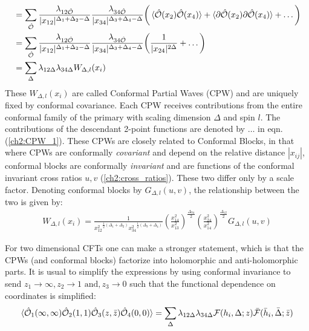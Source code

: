   \begin{align}
  &= \sum_{\hat{\mathcal{{O}}}}  \frac{\lambda_{12\hat{\mathcal{{O}}}}}{|x_{12}|^{\Delta_1+\Delta_2-\Delta}} \frac{\lambda_{34\hat{\mathcal{{O}}}}}{|x_{34}|^{\Delta_3+\Delta_4-\Delta}} \bigg( \braket{\hat{\mathcal{{O}}}(x_2)\hat{\mathcal{{O}}}(x_4)}+\braket{\partial \hat{\mathcal{{O}}}(x_2) \partial \hat{\mathcal{{O}}}(x_4)}+\dots \bigg) \label{ch2:CPW_0}\\
  &= \sum_{\hat{\mathcal{{O}}}}  \frac{\lambda_{12\hat{\mathcal{{O}}}}}{|x_{12}|^{\Delta_1+\Delta_2-\Delta}} \frac{\lambda_{34\hat{\mathcal{{O}}}}}{|x_{34}|^{\Delta_3+\Delta_4-\Delta}} \bigg( \frac{1}{|x_{24}|^{2\Delta}}+\dots \bigg) \label{ch2:CPW_1}\\
   &=\sum_{\Delta}  \lambda_{12\Delta} \lambda_{34\Delta} W_{\Delta,l}(x_i) \label{ch2:CPW_2}
  \end{align}
  These $W_{\Delta,l}(x_i)$ are called Conformal Partial Waves (CPW) and are uniquely fixed by conformal covariance. Each CPW receives contributions from the entire conformal family of the primary with scaling dimension $\Delta$ and spin $l$. The contributions of the descendant 2-point functions are denoted by $\dots$ in eqn. (\ref{ch2:CPW_1}). These CPWs are closely related to Conformal Blocks, in that where CPWs are conformally \emph{covariant} and depend on the relative distance $|x_{ij}|$, conformal blocks are conformally \emph{invariant} and are functions of the conformal invariant cross ratios $u,v$ (\ref{ch2:cross_ratios}). These two differ only by a scale factor. Denoting conformal blocks by $G_{\Delta,l}(u,v)$, the relationship between the two is given by:
  \begin{align} \label{ch2:CPW}
   W_{\Delta,l}(x_i)=\frac{1}{{x_{12}^2}^{\frac{1}{2}(\Delta_1+\Delta_2)}{x_{34}^2}^{\frac{1}{2}(\Delta_3+\Delta_4)}} \left(\frac{x_{14}^2} {x_{13}^2}\right)^\frac{\Delta_{34}}{2} \left(\frac{x_{24}^2}{x_{14}^2}\right)^\frac{\Delta_{12}}{2} G_{\Delta,l}(u,v)
  \end{align}
  
  For two dimensional CFTs one can make a stronger statement, which is that the CPWs (and conformal blocks) factorize into holomorphic and anti-holomorphic parts. It is usual to simplify the expressions by using conformal invariance to send $z_1 \to \infty, z_2 \to 1 \text{ and}, z_3 \to 0$ such that the functional dependence on coordinates is simplified:
  \begin{align}
   \braket{\hat{\mathcal{{O}}}_1(\infty,\infty)\hat{\mathcal{{O}}}_2(1,1)\hat{\mathcal{{O}}}_3(z,\bar{z})\hat{\mathcal{{O}}}_4(0,0)}= \sum_{\Delta}  \lambda_{12\Delta} \lambda_{34\Delta} \mathcal{F}(h_i,\Delta;z) \bar{\mathcal{F}}(\bar{h}_i,\bar{\Delta};\bar{z})
  \end{align}

